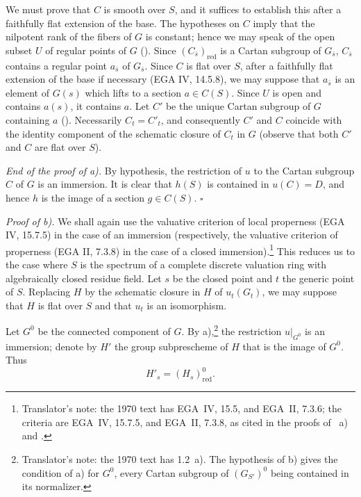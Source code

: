 We must prove that \(C\) is smooth over \(S\), and it suffices to
establish this after a faithfully flat extension of the base. The
hypotheses on \(C\) imply that the nilpotent rank of the fibers of
\(G\) is constant; hence we may speak of the open subset \(U\) of
regular points of \(G\) (). Since
\((C_{\bar s})_{\mathrm{red}}\) is a Cartan subgroup of
\(G_{\bar s}\), \(C_{\bar s}\) contains a regular point
\(a_{\bar s}\) of \(G_{\bar s}\). Since \(C\) is flat over \(S\),
after a faithfully flat extension of the base if necessary
(EGA IV, 14.5.8), we may suppose that \(a_{\bar s}\) is an element
of \(G(s)\) which lifts to a section \(a\in C(S)\). Since \(U\) is
open and contains \(a(s)\), it contains \(a\). Let \(C'\) be the
unique Cartan subgroup of \(G\) containing \(a\) ().
Necessarily \(C_t=C'_t\), and consequently \(C'\) and \(C\) coincide
with the identity component of the schematic closure of \(C_t\) in
\(G\) (observe that both \(C'\) and \(C\) are flat over \(S\)).

\smallskip
\noindent\textit{End of the proof of  a).}
By hypothesis, the restriction of \(u\) to the Cartan subgroup \(C\)
of \(G\) is an immersion. It is clear that \(h(S)\) is contained in
\(u(C)=D\), and hence \(h\) is the image of a section \(g\in C(S)\).
\hfill\(\square\)

\medskip
\noindent\textit{Proof of  b).}
We shall again use the valuative criterion of local properness
(EGA IV, 15.7.5) in the case of an immersion (respectively, the
valuative criterion of properness (EGA II, 7.3.8) in the case of a
closed immersion).\footnote{Translator's note: the 1970 text has EGA~IV, 15.5, and EGA~II, 7.3.6;
the criteria are EGA~IV, 15.7.5, and EGA~II, 7.3.8, as cited in the proofs of
~a) and .} This reduces us to the case where \(S\) is the
spectrum of a complete discrete valuation ring with algebraically
closed residue field. Let \(s\) be the closed point and \(t\) the
generic point of \(S\). Replacing \(H\) by the schematic closure in
\(H\) of \(u_t(G_t)\), we may suppose that \(H\) is flat over \(S\)
and that \(u_t\) is an isomorphism.

Let \(G^0\) be the connected component of \(G\). By  a),\footnote{Translator's note: the 1970 text has 1.2~a).
The hypothesis of b) gives the condition of a) for \(G^0\), every Cartan subgroup of
\((G_{S'})^0\) being contained in its normalizer.} the
restriction \(u|_{G^0}\) is an immersion; denote by \(H'\) the group
subprescheme of \(H\) that is the image of \(G^0\). Thus
\[
  H'_s=(H_s)_{\mathrm{red}}^0.
\]

